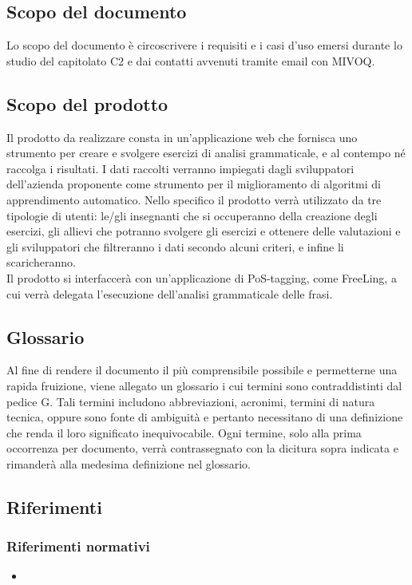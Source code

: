 \subsection{Scopo del documento}
Lo scopo del documento è circoscrivere i requisiti e i casi d’uso emersi durante lo studio del capitolato C2 e dai contatti avvenuti tramite email con MIVOQ.
\subsection{Scopo del prodotto}
Il prodotto da realizzare consta in un’applicazione web che fornisca uno strumento per creare e svolgere esercizi di analisi grammaticale, e al contempo né raccolga i risultati. I dati raccolti verranno impiegati dagli sviluppatori dell’azienda proponente come strumento per il miglioramento di algoritmi di {apprendimento automatico}. Nello specifico il prodotto verrà utilizzato da tre tipologie di utenti:
le/gli insegnanti che si occuperanno della creazione degli esercizi,
gli allievi che potranno svolgere gli esercizi e ottenere delle valutazioni e gli sviluppatori che filtreranno i dati secondo alcuni criteri, e infine li scaricheranno.\\Il prodotto si interfaccerà con un’applicazione di {PoS-tagging}, come {FreeLing}, a cui verrà delegata l’esecuzione dell’analisi grammaticale delle frasi.
\subsection{Glossario}
Al fine di rendere il documento il più comprensibile possibile e permetterne una rapida fruizione, viene allegato un glossario i cui termini sono contraddistinti dal pedice G. Tali termini includono abbreviazioni, acronimi, termini di natura tecnica, oppure sono fonte di ambiguità e pertanto necessitano di una definizione che renda il loro significato inequivocabile. 
Ogni termine, solo alla prima occorrenza per documento, verrà contrassegnato con la dicitura sopra indicata e rimanderà alla medesima definizione nel glossario.
\subsection{Riferimenti}
\subsubsection{Riferimenti normativi}
\begin{itemize}
\item \NdPv
\end{itemize}
